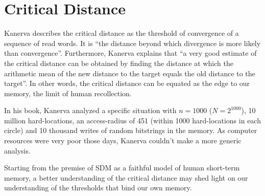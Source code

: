\section{Critical Distance}

Kanerva describes the critical distance as the threshold of convergence of a sequence of read words. It is ``the distance beyond which divergence is more likely than convergence''\citep{Kanerva1988}. Furthermore, Kanerva explains that ``a very good estimate of the critical distance can be obtained by finding the distance at which the arithmetic mean of the new distance to the target equals the old distance to the target''\citep{Kanerva1988}.  In other words, the critical distance can be equated as the edge to our memory, the limit of human recollection.

In his book, Kanerva analyzed a specific situation with $n=1000$ ($N=2^{1000}$), 10 million hard-locations, an access-radius of 451 (within 1000 hard-locations in each circle) and 10 thousand writes of random bitstrings in the memory. As computer resources were very poor those days, Kanerva couldn't make a more generic analysis.

Starting from the premise of SDM as a faithful model of human short-term memory, a better understanding of the critical distance may shed light on our understanding of the thresholds that bind our own memory.


